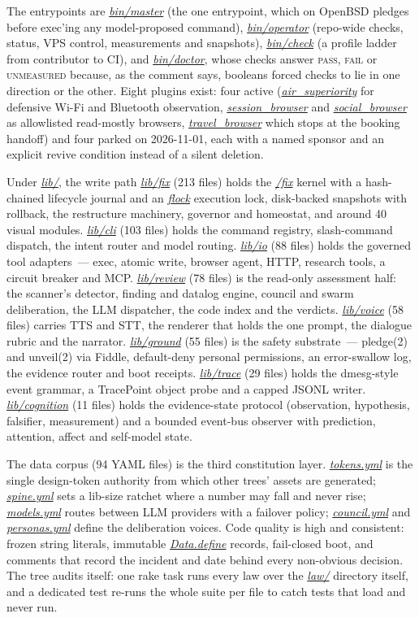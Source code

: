 \documentclass[oneside]{article}
\newcommand{\fpath}[1]{\emph{\url{#1}}}
\begin{document}
The entrypoints are \fpath{bin/master} (the one entrypoint, which on OpenBSD pledges before exec'ing any model-proposed command), \fpath{bin/operator} (repo-wide checks, status, VPS control, measurements and snapshots), \fpath{bin/check} (a profile ladder from contributor to CI), and \fpath{bin/doctor}, whose checks answer \textsc{pass}, \textsc{fail} or \textsc{unmeasured} because, as the comment says, booleans forced checks to lie in one direction or the other. Eight plugins exist: four active (\fpath{air_superiority} for defensive Wi-Fi and Bluetooth observation, \fpath{session_browser} and \fpath{social_browser} as allowlisted read-mostly browsers, \fpath{travel_browser} which stops at the booking handoff) and four parked on 2026-11-01, each with a named sponsor and an explicit revive condition instead of a silent deletion.

Under \fpath{lib/}, the write path \fpath{lib/fix} (213 files) holds the \fpath{/fix} kernel with a hash-chained lifecycle journal and an \fpath{flock} execution lock, disk-backed snapshots with rollback, the restructure machinery, governor and homeostat, and around 40 visual modules. \fpath{lib/cli} (103 files) holds the command registry, slash-command dispatch, the intent router and model routing. \fpath{lib/io} (88 files) holds the governed tool adapters~--- exec, atomic write, browser agent, HTTP, research tools, a circuit breaker and MCP. \fpath{lib/review} (78 files) is the read-only assessment half: the scanner's detector, finding and datalog engine, council and swarm deliberation, the LLM dispatcher, the code index and the verdicts. \fpath{lib/voice} (58 files) carries TTS and STT, the renderer that holds the one prompt, the dialogue rubric and the narrator. \fpath{lib/ground} (55 files) is the safety substrate~--- pledge(2) and unveil(2) via Fiddle, default-deny personal permissions, an error-swallow log, the evidence router and boot receipts. \fpath{lib/trace} (29 files) holds the dmesg-style event grammar, a TracePoint object probe and a capped JSONL writer. \fpath{lib/cognition} (11 files) holds the evidence-state protocol (observation, hypothesis, falsifier, measurement) and a bounded event-bus observer with prediction, attention, affect and self-model state.

The data corpus (94 YAML files) is the third constitution layer. \fpath{tokens.yml} is the single design-token authority from which other trees' assets are generated; \fpath{spine.yml} sets a lib-size ratchet where a number may fall and never rise; \fpath{models.yml} routes between LLM providers with a failover policy; \fpath{council.yml} and \fpath{personas.yml} define the deliberation voices. Code quality is high and consistent: frozen string literals, immutable \fpath{Data.define} records, fail-closed boot, and comments that record the incident and date behind every non-obvious decision. The tree audits itself: one rake task runs every law over the \fpath{law/} directory itself, and a dedicated test re-runs the whole suite per file to catch tests that load and never run.
\end{document}
